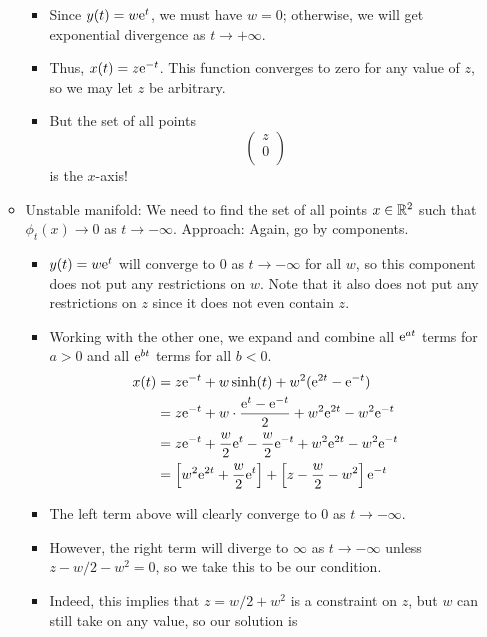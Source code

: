 \documentclass[../notes.tex]{subfiles}
\begin{document}
\begin{itemize}
\begin{itemize}
        \begin{itemize}
            \item Since $y(t)=w\e[t]$, we must have $w=0$; otherwise, we will get exponential divergence as $t\to +\infty$.
            \item Thus, $x(t)=z\e[-t]$. This function converges to zero for any value of $z$, so we may let $z$ be arbitrary.
            \item But the set of all points
            \begin{equation*}
                \begin{pmatrix}
                    z\\
                    0\\
                \end{pmatrix}
            \end{equation*}
            is the $x$-axis!
        \end{itemize}
        \item Unstable manifold: We need to find the set of all points $x\in\R^2$ such that $\phi_t(x)\to 0$ as $t\to -\infty$. Approach: Again, go by components.
        \begin{itemize}
            \item $y(t)=w\e[t]$ will converge to 0 as $t\to -\infty$ for all $w$, so this component does not put any restrictions on $w$. Note that it also does not put any restrictions on $z$ since it does not even contain $z$.
            \item Working with the other one, we expand and combine all $\e[at]$ terms for $a>0$ and all $\e[bt]$ terms for all $b<0$.
            \begin{align*}
                x(t) &= z\e[-t]+w\sinh(t)+w^2(\e[2t]-\e[-t])\\
                &= z\e[-t]+w\cdot\frac{\e[t]-\e[-t]}{2}+w^2\e[2t]-w^2\e[-t]\\
                &= z\e[-t]+\frac{w}{2}\e[t]-\frac{w}{2}\e[-t]+w^2\e[2t]-w^2\e[-t]\\
                &= \left[ w^2\e[2t]+\frac{w}{2}\e[t] \right]+\left[ z-\frac{w}{2}-w^2 \right]\e[-t]
            \end{align*}
            \item The left term above will clearly converge to 0 as $t\to -\infty$.
            \item However, the right term will diverge to $\infty$ as $t\to -\infty$ unless $z-w/2-w^2=0$, so we take this to be our condition.
            \item Indeed, this implies that $z=w/2+w^2$ is a constraint on $z$, but $w$ can still take on any value, so our solution is

\end{itemize}
\end{itemize}
\end{itemize}
\end{document}
